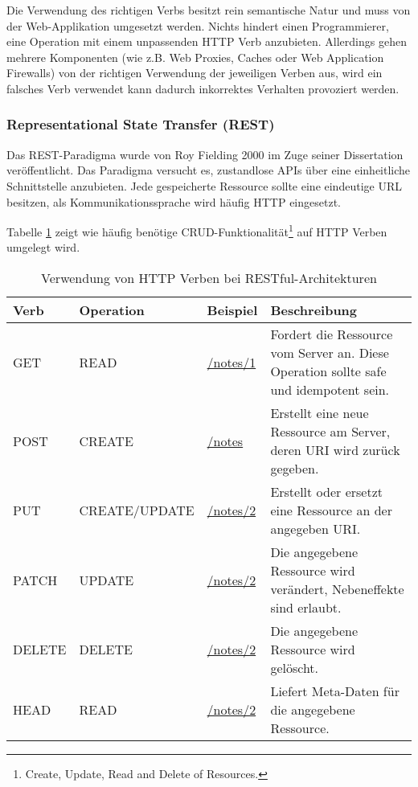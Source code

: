 Die Verwendung des richtigen Verbs besitzt rein semantische Natur und muss von der Web-Applikation umgesetzt werden. Nichts hindert einen Programmierer, eine Operation mit einem unpassenden HTTP Verb anzubieten. Allerdings gehen mehrere Komponenten (wie z.B. Web Proxies, Caches oder Web Application Firewalls) von der richtigen Verwendung der jeweiligen Verben aus, wird ein falsches Verb verwendet kann dadurch inkorrektes Verhalten provoziert werden.

\subsubsection{Representational State Transfer (REST)}

Das REST-Paradigma wurde von Roy Fielding 2000 im Zuge seiner Dissertation veröffentlicht. Das Paradigma versucht es, zustandlose APIs über eine einheitliche Schnittstelle anzubieten. Jede gespeicherte Ressource sollte eine eindeutige URL besitzen, als Kommunikationssprache wird häufig HTTP eingesetzt.

Tabelle \ref{tbl:rest} zeigt wie häufig benötige CRUD-Funktionalität\footnote{Create, Update, Read and Delete of Resources.} auf HTTP Verben umgelegt wird.

\begin{table}
	\begin{center}
\begin{tabular}{lllp{6cm}}
	\toprule
	Verb & Operation & Beispiel & Beschreibung \\
	\midrule
	GET  & READ & \url{/notes/1} & Fordert die Ressource vom Server an. Diese Operation sollte safe und idempotent sein. \\
	POST & CREATE & \url{/notes} &  Erstellt eine neue Ressource am Server, deren URI wird zurück gegeben.\\
	PUT  & CREATE/UPDATE & \url{/notes/2} & Erstellt oder ersetzt eine Ressource an der angegeben URI.\\
	PATCH & UPDATE & \url{/notes/2} & Die angegebene Ressource wird verändert, Nebeneffekte sind erlaubt. \\
	DELETE & DELETE & \url{/notes/2} & Die angegebene Ressource wird gelöscht. \\
	HEAD & READ & \url{/notes/2} & Liefert Meta-Daten für die angegebene Ressource. \\
	\bottomrule
\end{tabular}
	\caption{Verwendung von HTTP Verben bei RESTful-Architekturen}
	\label{tbl:rest}
\end{center}
\end{table}

